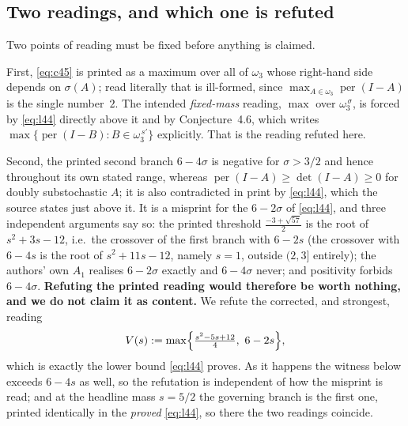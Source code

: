\documentclass[11pt]{amsart}
\theoremstyle{remark}
\DeclareMathOperator{\per}{per}
\newcommand{\ws}{\omega}
\begin{document}
\subsection*{Two readings, and which one is refuted}
Two points of reading must be fixed before anything is claimed.

First, \eqref{eq:c45} is printed as a maximum over all of $\ws_3$ whose right-hand
side depends on $\sigma(A)$; read literally that is ill-formed, since
$\max_{A\in\ws_3}\per(I-A)$ is the single number~$2$. The intended
\emph{fixed-mass} reading, $\max$ over $\ws_3^{\,\sigma}$, is forced by
\eqref{eq:l44} directly above it and by Conjecture~4.6, which writes
$\max\{\per(I-B):B\in\ws_3^{\,s'}\}$ explicitly. That is the reading refuted here.

Second, the printed second branch $6-4\sigma$ is negative for $\sigma>3/2$ and hence
throughout its own stated range, whereas $\per(I-A)\ge\det(I-A)\ge0$ for doubly
substochastic $A$; it is also contradicted in print by \eqref{eq:l44}, which the
source states just above it. It is a misprint for the $6-2\sigma$ of \eqref{eq:l44}, and three
independent arguments say so: the printed threshold $\frac{-3+\sqrt{57}}2$ is the root
of $s^{2}+3s-12$, i.e.\ the crossover of the first branch with $6-2s$ (the crossover
with $6-4s$ is the root of $s^{2}+11s-12$, namely $s=1$, outside $(2,3]$
entirely); the authors' own $A_1$ realises $6-2\sigma$ exactly and $6-4\sigma$ never;
and positivity forbids $6-4\sigma$. \textbf{Refuting the printed reading would
therefore be worth nothing, and we do not claim it as content.} We refute the
corrected, and strongest, reading
\begin{equation}\label{eq:V}
 V(s):=\max\Bigl\{\tfrac{s^{2}-5s+12}{4},\ 6-2s\Bigr\},
\end{equation}
which is exactly the lower bound \eqref{eq:l44} proves. As it happens the witness
below exceeds $6-4s$ as well, so the refutation is independent of how the misprint
is read; and at the headline mass $s=5/2$ the governing branch is the first one,
printed identically in the \emph{proved} \eqref{eq:l44}, so there the two readings
coincide.
\end{document}
